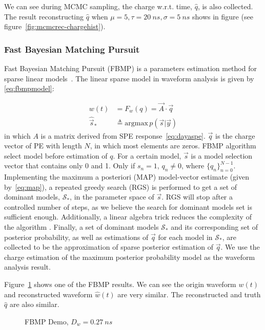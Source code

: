 We can see during MCMC sampling, the charge w.r.t. time, $\hat{q}$, is also collected. The result reconstructing $\hat{q}$ when $\mu=5, \tau=\SI{20}{ns}, \sigma=\SI{5}{ns}$ shows in figure (see figure~\ref{fig:mcmcrec-chargehist}). 

\subsubsection{Fast Bayesian Matching Pursuit}

Fast Bayesian Matching Pursuit (FBMP) is a parameters estimation method for sparse linear models~\cite{schniter_fast_nodate}. The linear sparse model in waveform analysis is given by \eqref{eq:fbmpmodel}: 

\begin{align}
    w(t) &= F_{w}(q) = \vec{A}\cdot \vec{q} \label{eq:fbmpmodel} \\
    \hat{\vec{s}}_{*} &\triangleq \mathrm{argmax}\,p(\vec{s}|\vec{y}) \label{eq:map}
\end{align}
in which $A$ is a matrix derived from SPE response~\eqref{eq:dayaspe}. $\vec{q}$ is the charge vector of PE with length $N$, in which most elements are zeros. FBMP algorithm select model before estimation of $q$. For a certain model, $\vec{s}$ is a model selection vector that contains only 0 and 1. Only if $s_{n}=1$, $q_{n}\neq0$, where $\{q_{n}\}_{n=0}^{N-1}$. Implementing the maximum a posteriori (MAP) model-vector estimate (given by~\eqref{eq:map}), a repeated greedy search (RGS) is performed to get a set of dominant models, $\mathcal{S}_{*}$, in the parameter space of $\vec{s}$. RGS will stop after a controlled number of steps, as we believe the search for dominant models set is sufficient enough. Additionally, a linear algebra trick reduces the complexity of the algorithm \cite{schniter_fast_nodate}. Finally, a set of dominant models $\mathcal{S}_{*}$ and its corresponding set of posterior probability, as well as estimations of $\vec{q}$ for each model in $\mathcal{S}_{*}$, are collected to be the approximation of sparse posterior estimation of $\vec{q}$. We use the charge estimation of the maximum posterior probability model as the waveform analysis result. 

Figure~\ref{fig:fbmp} shows one of the FBMP results. We can see the origin waveform $w(t)$ and reconstructed waveform $\hat{w}(t)$ are very similar. The reconstructed and truth $\hat{q}$ are also similar. 

\begin{figure}[H]
    \centering
    \scalebox{0.4}{}
    \caption{\label{fig:fbmp} FBMP Demo, $D_w = \SI{0.27}{ns}$}
\end{figure}

